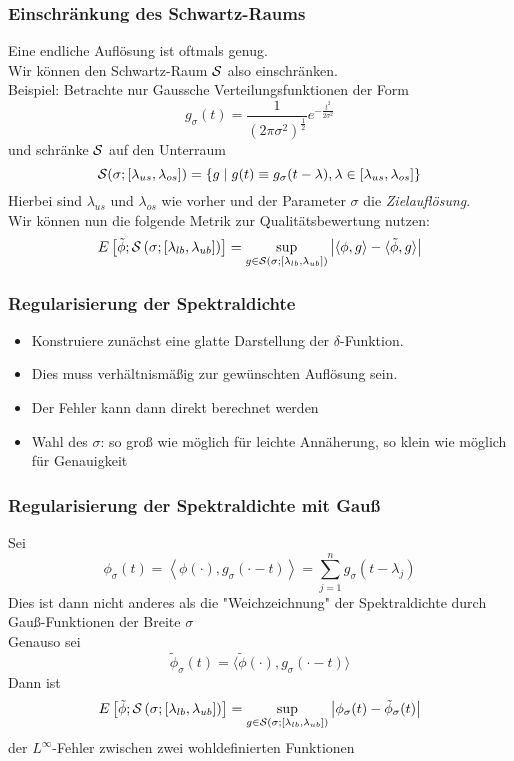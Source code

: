 \begin{frame}
    \frametitle{Einschränkung des Schwartz-Raums}
    Eine endliche Auflösung ist oftmals genug.\\
    Wir können den Schwartz-Raum $\mathcal{S}$ also einschränken.\\
    Beispiel: Betrachte nur Gaussche Verteilungsfunktionen der Form
    $$g_{\sigma}(t) = \frac{1}{(2\pi\sigma^2)^\frac{1}{2}}e^{-\frac{t^2}{2\sigma^2}}$$
    und schränke $\mathcal{S}$ auf den Unterraum
    $$\mathcal{S}(\sigma;[\lambda_{us}, \lambda_{os}]) = \left\{ g \;\middle|\; g(t) \equiv g_{\sigma}(t - \lambda), \lambda \in [\lambda_{us}, \lambda_{os}] \right\}$$
    Hierbei sind $\lambda_{us}$ und $\lambda_{os}$ wie vorher und der Parameter $\sigma$ die \emph{Zielauflösung}.\\
    Wir können nun die folgende Metrik zur Qualitätsbewertung nutzen:
    \begin{equation} \label{eq:error}
        E\left[\tilde{\phi};\mathcal{S}\left(\sigma; \left[\lambda_{lb}, \lambda_{ub} \right] \right)\right] = \sup_{g \in \mathcal{S}(\sigma;[\lambda_{lb}, \lambda_{ub}])} \left| \langle \phi, g \rangle - \langle \tilde{\phi}, g \rangle \right|
    \end{equation}
\end{frame}

\begin{frame}
    \frametitle{Regularisierung der Spektraldichte}
    \begin{itemize}
        \item Konstruiere zunächst eine glatte Darstellung der $\delta$-Funktion.
        \item Dies muss verhältnismäßig zur gewünschten Auflösung sein.
        \item Der Fehler kann dann direkt berechnet werden
        \item Wahl des $\sigma$: so groß wie möglich für leichte Annäherung, so klein wie möglich für Genauigkeit
    \end{itemize}
\end{frame}

\begin{frame}
    \frametitle{Regularisierung der Spektraldichte mit Gauß}
    Sei
    $$\phi_{\sigma}(t) = \left \langle \phi(\cdot), g_{\sigma}(\cdot - t)\right \rangle = \sum_{j = 1}^n g_{\sigma}(t - \lambda_j)$$
    Dies ist dann nicht anderes als die "Weichzeichnung" der Spektraldichte durch Gauß-Funktionen der Breite $\sigma$\\
    Genauso sei
    $$\tilde{\phi}_{\sigma}(t) = \langle \tilde{\phi}(\cdot), g_{\sigma}(\cdot - t) \rangle$$
    Dann ist
    $$E\left[\tilde{\phi};\mathcal{S}\left(\sigma; \left[\lambda_{lb}, \lambda_{ub} \right] \right)\right] = \sup_{g \in \mathcal{S}(\sigma;[\lambda_{lb}, \lambda_{ub}])} \left| \phi_{\sigma}(t) - \tilde{\phi}_{\sigma}(t) \right|$$
    der $L^\infty$-Fehler zwischen zwei wohldefinierten Funktionen
\end{frame}

